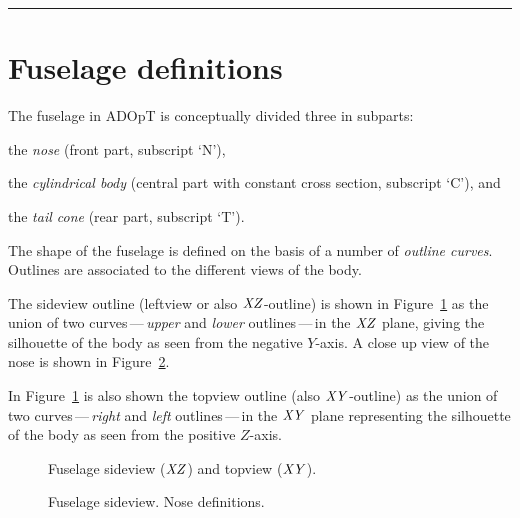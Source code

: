 \documentclass[a4paper]{article}
\newcommand{\ADOpT}{\mbox{\sffamily ADOpT}}
\begin{document}
\listoftodos

\bigskip
\noindent
\hrule

\bigskip

\section{Fuselage definitions}
The fuselage in \ADOpT{} is conceptually divided three in subparts:
\begin{compactitem}
\item
the \emph{nose} (front part, subscript `N'),
\item
the \emph{cylindrical body} (central part with constant cross section, subscript `C'), and
\item
the \emph{tail cone} (rear part, subscript `T').
\end{compactitem}

\medskip
The shape of the fuselage is defined on the basis of a number of \emph{outline curves}.
Outlines are associated to the different views of the body.

The sideview outline (leftview or also $\text{\textit{XZ}}$-outline) is shown in Figure~\ref{fig:Fuselage:Sideview}
as the union of two curves\,---\,\emph{upper} and \emph{lower} outlines\,---\,in the $\text{\textit{XZ}}$ plane, 
giving the silhouette of the body as seen from the 
negative $Y$-axis. A close up view of the nose is shown in Figure~\ref{fig:Fuselage:Sideview:Nose}.

In Figure~\ref{fig:Fuselage:Sideview} is also shown the topview outline (also $\text{\textit{XY}}$-outline)
as the union of two curves\,---\,\emph{right} and \emph{left} outlines\,---\,in the $\text{\textit{XY}}$ plane 
representing the silhouette of the body as seen from the positive $Z$-axis.

\begin{figure}[p]
\centering
{}
\caption{Fuselage sideview ($\text{\textit{XZ}}$) and topview ($\text{\textit{XY}}$).}
\label{fig:Fuselage:Sideview}
\end{figure}

\begin{figure}[t]
\centering
{}
\caption{Fuselage sideview. Nose definitions.}
\label{fig:Fuselage:Sideview:Nose}
\end{figure}
\end{document}
